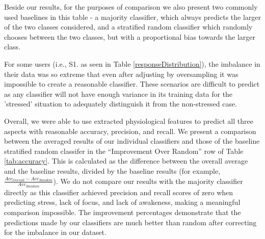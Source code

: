 Beside our results, for the purposes of comparison we also present two commonly used baselines in this table - a majority classifier, which always predicts the larger of the two classes considered, and a stratified random classifier which randomly chooses between the two classes, but with a proportional bias towards the larger class.

For some users (i.e., S1. as seen in Table \ref{responseDistribution}), the imbalance in their data was so extreme that even after adjusting by oversampling it was impossible to create a reasonable classifier. These scenarios are difficult to predict as any classifier will not have enough variance in its training data for the 'stressed' situation to adequately distinguish it from the non-stressed case.




Overall, we were able to use extracted physiological features to
predict all three aspects with reasonable accuracy, precision, and
recall. We present a comparison between the averaged results of our individual classifiers and those of the baseline stratified random classifer in the ``Improvement Over Random'' row of Table \ref{tab:accuracy}. This is calculated as the difference between the overall average and the baseline results, divided by the baseline results (for example, $\frac{Acc_{Overall} - Acc_{Random}}{Acc_{Random}}$). We do not compare our results with the majority classifier directly as this classifier achieved precision and recall scores of zero when predicting stress, lack of focus, and lack of awakeness, making a meaningful comparison impossible. The improvement percentages demonstrate that the predictions made by our classifiers are much better than random after correcting for the imbalance in our dataset.

